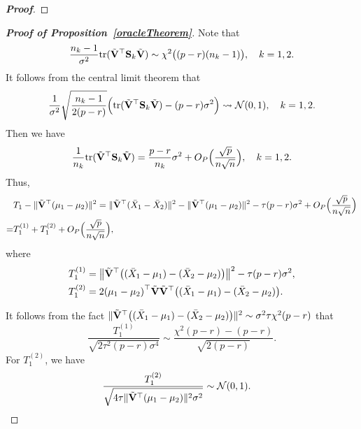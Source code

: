 \documentclass[times,sort&compress,3p]{elsarticle}
\newcommand{\mytr}{ {\rm tr} }
\theoremstyle{plain}
\theoremstyle{definition}
\theoremstyle{remark}
\begin{document}
\begin{appendices}
\begin{proof}[\textbf{Proof}]
\end{proof}


\begin{proof}[\textbf{Proof of Proposition~\ref{oracleTheorem}}]
    Note that
    $$
    \frac{n_k-1}{\sigma^2} \mytr(\tilde{\BV}^\top  \BS_k \tilde{\BV})\sim \chi^2\big((p-r)(n_k-1)\big),\quad k=1,2.
    $$
    It follows from the central limit theorem that
    \begin{equation*}
        \begin{aligned}
            \frac{1}{\sigma^2}\sqrt{\frac{n_k-1}{2(p-r)}}\Big( \mytr(\tilde{\BV}^\top  \BS_k \tilde{\BV})-(p-r)\sigma^2\Big)\rightsquigarrow \mathcal{N}(0,1),\quad k=1,2.
        \end{aligned}
    \end{equation*}
    Then we have
    $$
           \frac{1}{n_k} \mytr(\tilde{\BV}^\top  \BS_k \tilde{\BV}) =
            \frac{p-r}{n_k}\sigma^2 + O_P\Big(\frac{\sqrt{p}}{n\sqrt{n}}\Big),\quad k=1,2.
    $$
    Thus,
    \begin{equation*}
        \begin{aligned}
            &T_1-\|\tilde{\mathbf{V}}^\top (\mu_1-\mu_2)\|^2=
            \|\tilde{\mathbf{V}}^\top (\bar{X}_1-\bar{X}_2)\|^2-
            \|\tilde{\mathbf{V}}^\top (\mu_1-\mu_2)\|^2
            -  \tau (p-r)\sigma^2 + O_P\Big(\frac{\sqrt{p}}{n\sqrt{n}}\Big)\\
            =&
            T_1^{(1)}+T_1^{(2)}
            + O_P\Big(\frac{\sqrt{p}}{n\sqrt{n}}\Big)
            ,
        \end{aligned}
    \end{equation*}
    where
    \begin{align*}
        T_1^{(1)}&=\big\|\tilde{\mathbf{V}}^\top \big((\bar{X}_1-\mu_1)-(\bar{X}_2-\mu_2)\big)\big\|^2   -  \tau (p-r)\sigma^2, \\
        T_1^{(2)}&=2{(\mu_1-\mu_2)}^\top \tilde{\mathbf{V}}\tilde{\mathbf{V}}^\top \big((\bar{X}_1-\mu_1)-(\bar{X}_2-\mu_2)\big).
    \end{align*}

It follows from the fact
$\|\tilde{\mathbf{V}}^\top  \big( (\bar{X}_1-\mu_1)-(\bar{X}_2-\mu_2) \big)\|^2\sim \sigma^2\tau\chi^2(p-r)$ that
$$
            \frac{T_1^{(1)}}{\sqrt{2\tau^2 (p-r)\sigma^4}}\sim \frac{\chi^2 (p-r)- (p-r)}{\sqrt{2(p-r)}}.
    $$
    For $T_1^{(2)}$, we have
    \begin{equation*}
        \begin{aligned}
            &\frac{T_1^{(2)}}{\sqrt{4\tau\|\tilde{\mathbf{V}}^\top (\mu_1-\mu_2)\|^2\sigma^2}}
            \sim \mathcal{N}(0,1).
        \end{aligned}
    \end{equation*}


\end{proof}
\end{appendices}
\end{document}
